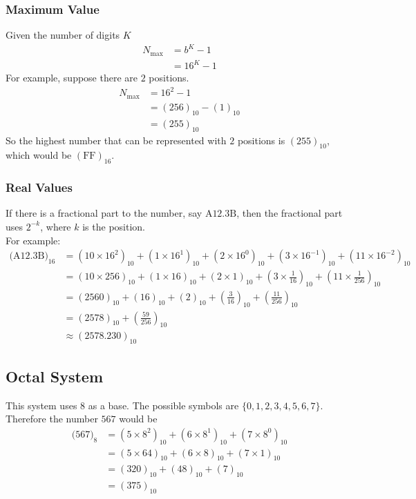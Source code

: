 \documentclass[\main/notes.tex]{subfiles}
\begin{document}
				\subsubsection{Maximum Value}
					Given the number of digits $K$
					\begin{align*}
						N_{\max} &= b^{K} - 1\\
						&= 16^{K} - 1
					\end{align*}
					For example, suppose there are $2$ positions.
					\begin{align*}
						N_{\max} &= 16^{2} - 1\\
						&= (256)_{10} - (1)_{10}\\
						&= (255)_{10}
					\end{align*}
					So the highest number that can be represented with $2$ positions is $(255)_{10}$, which would be $(\mathrm{FF})_{16}$.
				\subsubsection{Real Values}
					If there is a fractional part to the number, say $\mathrm{A}12.3\mathrm{B}$, then the fractional part uses $2^{-k}$, where $k$ is the position.\\
					For example:
					\begin{align*}
						\bigl(\mathrm{A}12.3\mathrm{B}\bigr)_{16} &= \left(10 \times 16^{2}\right)_{10} + \left(1 \times 16^{1}\right)_{10} + \left(2 \times 16^{0}\right)_{10} + \left(3 \times 16^{-1}\right)_{10} + \left(11 \times 16^{-2}\right)_{10}\\
						&= (10 \times 256)_{10} + (1 \times 16)_{10} + (2 \times 1)_{10} + \left(3 \times \frac{1}{16}\right)_{10} + \left(11 \times \frac{1}{256}\right)_{10}\\
						&= (2560)_{10} + (16)_{10} + (2)_{10} + \left(\frac{3}{16}\right)_{10} + \left(\frac{11}{256}\right)_{10}\\
						&= (2578)_{10} + \left(\frac{59}{256}\right)_{10}\\
						& \approx (2578.230)_{10}
					\end{align*}
			\pagebreak
			\subsection{Octal System}
				This system uses $8$ as a base. The possible symbols are $\{0, 1, 2, 3, 4, 5, 6, 7\}$.\\
				Therefore the number $567$ would be
				\begin{align*}
					\bigl(567\bigr)_{8} &= \left(5 \times 8^{2}\right)_{10} + \left(6 \times 8^{1}\right)_{10} + \left(7 \times 8^{0}\right)_{10}\\
					&= (5 \times 64)_{10} + (6 \times 8)_{10} + (7 \times 1)_{10}\\
					&= (320)_{10} + (48)_{10} + (7)_{10}\\
					&= (375)_{10}
				\end{align*}
\end{document}
